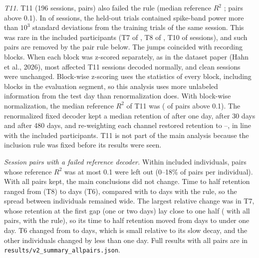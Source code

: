 \documentclass[pdflatex,sn-nature]{sn-jnl}
\begin{document}
\textit{T11.} T11 (196 sessions,  pairs) also failed the rule (median reference $R^2$ ;
 pairs above 0.1). In  of  sessions, the held-out trials
contained spike-band power more than $10^3$ standard deviations from the training trials of the same session. This was
rare in the included participants (T7  of , T8  of ,
T10  of  sessions), and such pairs are removed by the pair rule below. The jumps
coincided with recording blocks. When each block was z-scored separately, as in the dataset
paper (Hahn et al., 2026), most affected T11 sessions decoded normally, and clean sessions were unchanged. Block-wise
z-scoring uses the statistics of every block, including blocks in the evaluation segment, so this analysis uses more
unlabeled information from the test day than renormalization does. With block-wise
normalization, the median reference $R^2$ of T11 was  ( of  pairs above
0.1). The renormalized fixed decoder kept a median retention of  after one day,  after 30
days and  after 480 days, and re-weighting each channel restored retention to
--, in line with the included participants. T11 is not part of the main
analysis because the inclusion rule was fixed before its results were seen.

\textit{Session pairs with a failed reference decoder.} Within included individuals, pairs whose reference $R^2$ was at
most 0.1 were left out (0--18\% of pairs per individual). With all pairs kept, the main conclusions did not change.
Time to half retention ranged from  (T8) to  days (T6), compared with
 to  days with the rule, so the spread between individuals remained wide.
The largest relative change was in T7, whose retention at the first gap (one or two days) lay close to one half ( with all
pairs,  with the rule), so its time to half retention moved from  days to under one day.
T6 changed from  to  days, which is small relative to its slow decay, and the other
individuals changed by less than one day. Full results with all pairs are in
\texttt{results/v2\_summary\_allpairs.json}.
\end{document}
